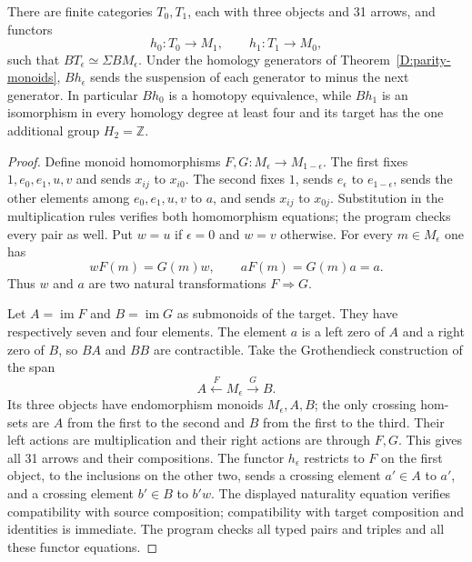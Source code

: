\begin{theorem}
\label{D:parity-shifts}
There are finite categories $T_0,T_1$, each with three objects and
31 arrows, and functors
\[
 h_0:T_0\longrightarrow M_1,\qquad
 h_1:T_1\longrightarrow M_0,
\]
such that $BT_\epsilon\simeq\Sigma BM_\epsilon$.
Under the homology generators of Theorem~\ref{D:parity-monoids},
$Bh_\epsilon$ sends the suspension of each generator to minus
the next generator.  In particular $Bh_0$ is a homotopy equivalence,
while $Bh_1$ is an isomorphism in every homology degree at least
four and its target has the one additional group $H_2=\mathbb Z$.
\end{theorem}
\begin{proof}
Define monoid homomorphisms $F,G:M_\epsilon\to M_{1-\epsilon}$.
The first fixes $1,e_0,e_1,u,v$ and sends $x_{ij}$ to $x_{i0}$.
The second fixes $1$, sends $e_\epsilon$ to $e_{1-\epsilon}$,
sends the other elements among $e_0,e_1,u,v$ to $a$, and sends
$x_{ij}$ to $x_{0j}$.  Substitution in the multiplication rules
verifies both homomorphism equations; the program checks every
pair as well.  Put $w=u$ if $\epsilon=0$ and $w=v$ otherwise.
For every $m\in M_\epsilon$ one has
\[
 wF(m)=G(m)w,\qquad aF(m)=G(m)a=a.
\]
Thus $w$ and $a$ are two natural transformations $F\Rightarrow G$.

Let $A=\operatorname{im}F$ and $B=\operatorname{im}G$ as
submonoids of the target.  They have respectively seven and four
elements.  The element $a$ is a left zero of $A$ and a right zero
of $B$, so $BA$ and $BB$ are contractible.
Take the Grothendieck construction of the span
\[
 A\xleftarrow{F}M_\epsilon\xrightarrow{G}B.
\]
Its three objects have endomorphism monoids $M_\epsilon,A,B$;
the only crossing hom-sets are $A$ from the first to the second
and $B$ from the first to the third.  Their left actions are
multiplication and their right actions are through $F,G$.
This gives all 31 arrows and their compositions.
The functor $h_\epsilon$ restricts to $F$ on the first object,
to the inclusions on the other two, sends a crossing element
$a'\in A$ to $a'$, and a crossing element $b'\in B$ to $b'w$.
The displayed naturality equation verifies compatibility with
source composition; compatibility with target composition and
identities is immediate.  The program checks all typed pairs
and triples and all these functor equations.


\end{proof}
